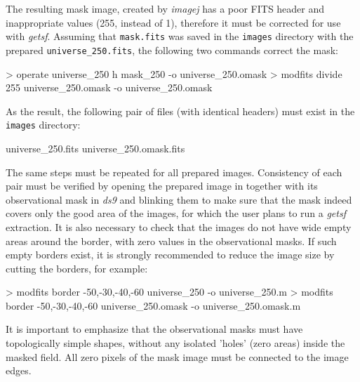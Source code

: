 \documentclass[a4paper,10pt]{article}
\begin{document}
The resulting mask image, created by \textsl{imagej} has a poor FITS header and inappropriate values (255, instead of 1), therefore
it must be corrected for use with \textsl{getsf}. Assuming that \verb!mask.fits! was saved in the \verb!images! directory with the
prepared \verb!universe_250.fits!, the following two commands correct the mask:
\begin{verbnobox}[\mbox{}\small]
> operate universe_250 h mask_250 -o universe_250.omask
> modfits divide 255 universe_250.omask -o universe_250.omask
\end{verbnobox}
As the result, the following pair of files (with identical headers) must exist in the \verb!images! directory:
\begin{verbnobox}[\mbox{}\small]
universe_250.fits
universe_250.omask.fits
\end{verbnobox}
The same steps must be repeated for all prepared images. Consistency of each pair must be verified by opening the prepared image in
together with its observational mask in \textsl{ds9} and blinking them to make sure that the mask indeed covers only the good area
of the images, for which the user plans to run a \textsl{getsf} extraction. It is also necessary to check that the images do not
have wide empty areas around the border, with zero values in the observational masks. If such empty borders exist, it is strongly
recommended to reduce the image size by cutting the borders, for example:
\begin{verbnobox}[\mbox{}\small]
> modfits border -50,-30,-40,-60 universe_250 -o universe_250.m
> modfits border -50,-30,-40,-60 universe_250.omask -o universe_250.omask.m
\end{verbnobox}
It is important to emphasize that the observational masks must have topologically simple shapes, without any isolated 'holes' (zero
areas) inside the masked field. All zero pixels of the mask image must be connected to the image edges.
\end{document}
